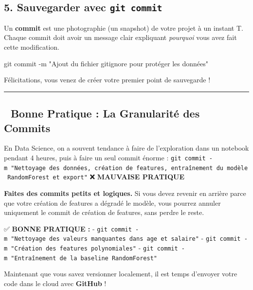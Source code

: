 \documentclass[
  letterpaper,
  DIV=11,
  numbers=noendperiod]{scrreprt}
\newenvironment{Shaded}{\begin{snugshade}}{\end{snugshade}}
\newcommand{\AttributeTok}[1]{\textcolor[rgb]{0.40,0.45,0.13}{#1}}
\newcommand{\FunctionTok}[1]{\textcolor[rgb]{0.28,0.35,0.67}{#1}}
\newcommand{\NormalTok}[1]{\textcolor[rgb]{0.00,0.23,0.31}{#1}}
\newcommand{\StringTok}[1]{\textcolor[rgb]{0.13,0.47,0.30}{#1}}
\begin{document}
\subsection{\texorpdfstring{5. Sauvegarder avec
\texttt{git\ commit}}{5. Sauvegarder avec git commit}}\label{sauvegarder-avec-git-commit}

Un \textbf{commit} est une photographie (un snapshot) de votre projet à
un instant T. Chaque commit doit avoir un message clair expliquant
\emph{pourquoi} vous avez fait cette modification.

\begin{Shaded}
\begin{Highlighting}[]
\FunctionTok{git}\NormalTok{ commit }\AttributeTok{{-}m} \StringTok{"Ajout du fichier gitignore pour protéger les données"}
\end{Highlighting}
\end{Shaded}

Félicitations, vous venez de créer votre premier point de sauvegarde !

\begin{center}\rule{0.5\linewidth}{0.5pt}\end{center}

\subsection{🎯 Bonne Pratique : La Granularité des
Commits}\label{bonne-pratique-la-granularituxe9-des-commits}

En Data Science, on a souvent tendance à faire de l'exploration dans un
notebook pendant 4 heures, puis à faire un seul commit énorme :
\texttt{git\ commit\ -m\ "Nettoyage\ des\ données,\ création\ de\ features,\ entraînement\ du\ modèle\ RandomForest\ et\ export"}
❌ \textbf{MAUVAISE PRATIQUE}

\textbf{Faites des commits petits et logiques.} Si vous devez revenir en
arrière parce que votre création de features a dégradé le modèle, vous
pourrez annuler uniquement le commit de création de features, sans
perdre le reste.

✅ \textbf{BONNE PRATIQUE :} -
\texttt{git\ commit\ -m\ "Nettoyage\ des\ valeurs\ manquantes\ dans\ age\ et\ salaire"}
- \texttt{git\ commit\ -m\ "Création\ des\ features\ polynomiales"} -
\texttt{git\ commit\ -m\ "Entraînement\ de\ la\ baseline\ RandomForest"}

Maintenant que vous savez versionner localement, il est temps d'envoyer
votre code dans le cloud avec \textbf{GitHub} !
\end{document}
